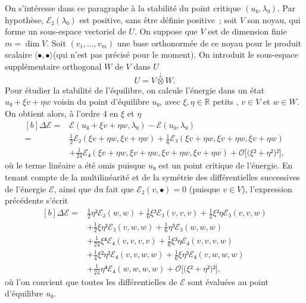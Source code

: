 \documentclass[12pt, final]{scrartcl}
\theoremstyle{definition}
\newcommand{\reals}{\mathbb{R}}
\begin{document}
On s'intéresse dans ce paragraphe à la stabilité du point critique
\((u₀, λ₀) .\) Par hypothèse, \(ℰ₂(λ₀)\) est positive, sans être définie
positive~; soit \(V\) son noyau, qui forme un sous-espace vectoriel de \(U\). On
suppose que \(V\) est de dimension finie \(m = \dim V\). Soit
\((v₁, \ldots, v_m)\) une base orthonormée de ce noyau pour le produit scalaire
\(〈 •, • 〉\)(qui n'est pas précisé pour le moment). On introduit le
sous-espace supplémentaire orthogonal \(W\) de \(V\) dans \(U\)
\begin{equation}
  U = V \overset{\perp}{\otimes} W.
\end{equation}
Pour étudier la stabilité de l'équilibre, on calcule l'énergie dans un état
\(u₀ + ξ  v + η  w\) voisin du point d'équilibre \(u₀\), avec \(ξ, η∈\reals\)
{\guillemotleft} petits {\guillemotright}, \(v \in V\) et \(w∈W\). On obtient
alors, à l'ordre 4 en \(ξ\) et \(η\)
\begin{equation}
  \begin{aligned}[b]
    Δℰ ={} &  ℰ(u₀ + ξv + ηw, λ₀) - ℰ(u₀, λ₀)\\
    ={} & \tfrac{1}{2} ℰ₂(ξv + ηw, ξv + ηw) + \tfrac{1}{6} ℰ₃(ξv + ηw, ξv + ηw, ξv + ηw)\\
    & + \tfrac{1}{24} ℰ₄(ξv + ηw, ξv + ηw, ξv + ηw, ξv + ηw) + \mathcal{O}\bigl[\bigl(ξ² + η²\bigr)²\bigr],
  \end{aligned}
\end{equation}
où le terme linéaire a été omis puisque \(u₀\) est un point critique de
l'énergie. En tenant compte de la multilinéarité et de la symétrie des
différentielles successives de l'énergie \(ℰ\), ainsi que du fait que
\(ℰ₂(v, •) = 0\) (puisque \(v∈V\)), l'expression précédente s'écrit
\begin{equation}
  \begin{aligned}[b]
    \Delta ℰ ={} & \tfrac{1}{2} η² ℰ₂(w, w) + \tfrac{1}{6} ξ³ ℰ₃(v, v, v) + \tfrac{1}{2} ξ² η ℰ₃(v, v, w)\\
    & + \tfrac{1}{2} ξ η² ℰ₃(v, w, w) + \tfrac{1}{6} η³ ℰ₃(w, w, w)\\
    & + \tfrac{1}{24} ξ⁴ ℰ₄(v, v, v, v) + \tfrac{1}{6} ξ³ η ℰ₄(v, v, v, w)\\
    & + \tfrac{1}{4} ξ² η² ℰ₄(v, v, w, w) + \tfrac{1}{6} ξ η³ ℰ₄(v, w, w, w)\\
    & + \tfrac{1}{24} η⁴ ℰ₄(w, w, w, w) +\mathcal{O}\bigl[\bigl(ξ² + η²\bigr)²\bigr],
  \end{aligned}
\end{equation}
où l'on convient que toutes les différentielles de \(ℰ\) sont évaluées au point
d'équilibre \(u₀\).
\end{document}

